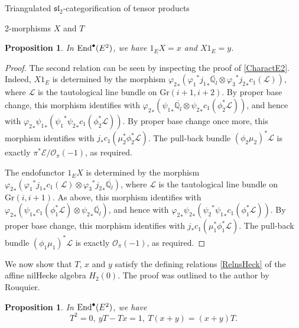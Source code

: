 \documentclass[12pt]{amsart}
\newtheorem{prpn}[thm]{Proposition}
\theoremstyle{definition}
\theoremstyle{remark}
\theoremstyle{remark}
\begin{document}
\begin{section}{Triangulated $\mathfrak{sl}_{2}$-categorification of tensor products}
\begin{subsection}{2-morphisms $X$ and $T$}
\begin{prpn} In ${\rm End}^{\bullet}(E^{2})$, we have $1_{E}X = x$ and $X1_{E} = y$. \end{prpn}    

\begin{proof} The second relation can be seen by inspecting the proof of \ref{CharactE2}. Indeed, $X1_{E}$ is determined by the morphism ${\varphi_{2}}_{*}({\varphi_{1}}^{*} {j_{1}}_{*} \overline{\mathbb{Q}_{l}} \otimes {\varphi_{3}}^{*} {j_{2}}_{*} c_{1}(\mathscr{L}))$, where $\mathscr{L}$ is the tautological line bundle on $\text{Gr}(i+1,i+2)$. By proper base change, this morphism identifies with   ${\varphi_{2}}_{*}({\psi_{1}}_{*} \overline{\mathbb{Q}_{l}} \otimes {\psi_{2}}_{*} c_{1}(\phi_{2}^{*}\mathscr{L}))$, and hence with ${\varphi_{2}}_{*}{\psi_{1}}_{*} ({\psi_{1}}^{*}{\psi_{2}}_{*} c_{1}(\phi_{2}^{*}\mathscr{L}))$. By proper base change once more, this morphism identifies with $j_{*}c_{1}(\mu_{2}^{*}\phi_{2}^{*}\mathscr{L})$. The pull-back bundle $(\phi_{2} \mu_{2})^{*} \mathscr{L}$ is exactly $\pi^{*} \mathscr{E} / \mathcal{O}_{\pi}(-1)$, as required.

The endofunctor $1_{E}X$ is determined by the morphism ${\varphi_{2}}_{*}({\varphi_{1}}^{*} {j_{1}}_{*} c_{1}(\mathscr{L}) \otimes {\varphi_{3}}^{*} {j_{2}}_{*} \overline{\mathbb{Q}_{l}})$, where $\mathscr{L}$ is the tautological line bundle on $\text{Gr}(i,i+1)$. As above, this morphism identifies with ${\varphi_{2}}_{*}({\psi_{1}}_{*} c_{1}(\phi_{1}^{*}\mathscr{L})  \otimes {\psi_{2}}_{*} \overline{\mathbb{Q}_{l}} )$, and hence with ${\varphi_{2}}_{*}{\psi_{2}}_{*} ({\psi_{2}}^{*}{\psi_{1}}_{*} c_{1}(\phi_{1}^{*}\mathscr{L}))$. By proper base change, this morphism identifies with $j_{*}c_{1}(\mu_{1}^{*}\phi_{1}^{*}\mathscr{L})$. The pull-back bundle $(\phi_{1} \mu_{1})^{*} \mathscr{L}$ is exactly $\mathcal{O}_{\pi}(-1)$, as required. 
\end{proof}

We now show that $T$, $x$ and $y$ satisfy the defining relations \ref{RelnsHeck} of the affine nilHecke algebra $H_{2}(0)$. The proof was outlined to the author by Rouquier.

\begin{prpn} \label{CatHeckRelns} In ${\rm End}^{\bullet}(E^{2})$, we have \[ T^{2} = 0, \ yT - Tx = 1, \ T(x+y) = (x+y)T. \] \end{prpn}


\end{subsection}
\end{section}
\end{document}
